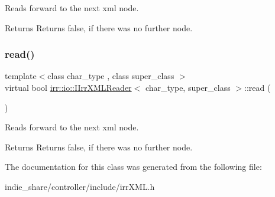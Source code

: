 Reads forward to the next xml node. 

\begin{DoxyReturn}{Returns}
Returns false, if there was no further node. 
\end{DoxyReturn}
\mbox{\label{classirr_1_1io_1_1IIrrXMLReader_a157f458f7dabeeff173f72a0fb443a8e}} 
\subsubsection{\texorpdfstring{read()}{read()}\hspace{0.1cm}{\footnotesize\ttfamily [2/2]}}
{\footnotesize\ttfamily template$<$class char\+\_\+type , class super\+\_\+class $>$ \\
virtual bool \hyperlink{classirr_1_1io_1_1IIrrXMLReader}{irr\+::io\+::\+I\+Irr\+X\+M\+L\+Reader}$<$ char\+\_\+type, super\+\_\+class $>$\+::read (\begin{DoxyParamCaption}{ }\end{DoxyParamCaption})\hspace{0.3cm}{\ttfamily [pure virtual]}}



Reads forward to the next xml node. 

\begin{DoxyReturn}{Returns}
Returns false, if there was no further node. 
\end{DoxyReturn}


The documentation for this class was generated from the following file\+:\begin{DoxyCompactItemize}
\item 
indie\+\_\+share/controller/include/irr\+X\+M\+L.\+h\end{DoxyCompactItemize}

